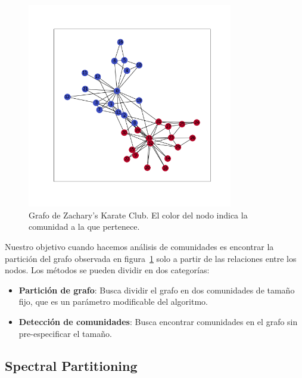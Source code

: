 \documentclass{article}
\begin{document}
\begin{figure}[htb]
    \centering
    \includegraphics[width=0.8\textwidth]{imagenes/karate_club.png}
    \caption{Grafo de Zachary's Karate Club. El color del nodo indica la comunidad a la que pertenece.}
    \label{fig: karate_club}
\end{figure}

Nuestro objetivo cuando hacemos análisis de comunidades es encontrar la partición del grafo observada en figura~\ref{fig: karate_club} solo a partir de las relaciones entre los nodos. Los métodos se pueden dividir en dos categorías:
\begin{itemize}
    \item \textbf{Partición de grafo}: Busca dividir el grafo en dos comunidades de tamaño fijo, que es un parámetro modificable del algoritmo.
    \item \textbf{Detección de comunidades}: Busca encontrar comunidades en el grafo sin pre-especificar el tamaño.
\end{itemize}

\subsection{Spectral Partitioning}
\end{document}
